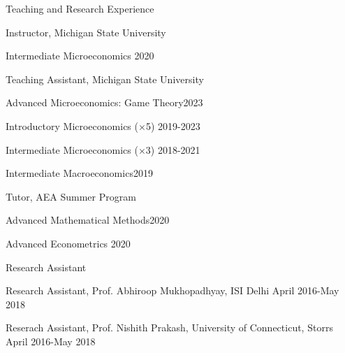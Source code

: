 \documentclass{resume} %
\begin{document}

\begin{rSection}{Teaching and Research Experience} \itemsep -2pt
\vspace{.5em}
\begin{rSubsection}{Instructor, Michigan State University}{}{}{}
\item[] \quad Intermediate Microeconomics \hfill{2020}


\end{rSubsection}


\begin{rSubsection}{Teaching Assistant, Michigan State University}{}{}{}
\item[] \quad Advanced Microeconomics: Game Theory\hfill{2023}
\item[] \quad Introductory Microeconomics ($\times$5) \hfill{2019-2023}
\item[] \quad Intermediate Microeconomics ($\times$3) \hfill{2018-2021}
\item[] \quad Intermediate Macroeconomics\hfill{2019}
\end{rSubsection}


\begin{rSubsection}{Tutor, AEA Summer Program}{}{}{}
	\item[] \quad Advanced Mathematical Methods\hfill{2020}
	\item[] \quad Advanced Econometrics \hfill{2020}

\end{rSubsection}


\begin{rSubsection}{Research Assistant}{}{}{}
\item[] \quad Research Assistant, Prof. Abhiroop Mukhopadhyay, ISI Delhi \hfill{April 2016-May 2018}
\item[] \quad Reserach Assistant, Prof. Nishith Prakash, University of Connecticut, Storrs \hfill{April 2016-May 2018}
\end{rSubsection}


\end{rSection}


\vspace{0.5em}
\end{document}
